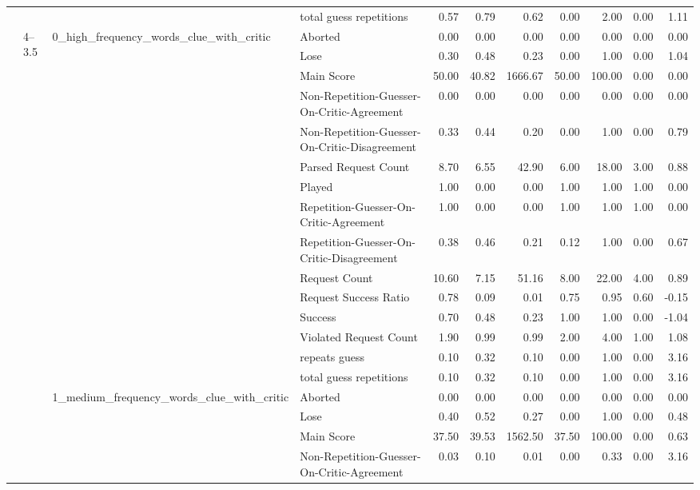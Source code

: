 \begin{tabular}{llllrrrrrrr}
 &  &  & total guess repetitions & 0.57 & 0.79 & 0.62 & 0.00 & 2.00 & 0.00 & 1.11 \\
\cline{2-11} \cline{3-11}
 & \multirow[t]{45}{*}{4--3.5} & \multirow[t]{15}{*}{0_high_frequency_words_clue_with_critic} & Aborted & 0.00 & 0.00 & 0.00 & 0.00 & 0.00 & 0.00 & 0.00 \\
 &  &  & Lose & 0.30 & 0.48 & 0.23 & 0.00 & 1.00 & 0.00 & 1.04 \\
 &  &  & Main Score & 50.00 & 40.82 & 1666.67 & 50.00 & 100.00 & 0.00 & 0.00 \\
 &  &  & Non-Repetition-Guesser-On-Critic-Agreement & 0.00 & 0.00 & 0.00 & 0.00 & 0.00 & 0.00 & 0.00 \\
 &  &  & Non-Repetition-Guesser-On-Critic-Disagreement & 0.33 & 0.44 & 0.20 & 0.00 & 1.00 & 0.00 & 0.79 \\
 &  &  & Parsed Request Count & 8.70 & 6.55 & 42.90 & 6.00 & 18.00 & 3.00 & 0.88 \\
 &  &  & Played & 1.00 & 0.00 & 0.00 & 1.00 & 1.00 & 1.00 & 0.00 \\
 &  &  & Repetition-Guesser-On-Critic-Agreement & 1.00 & 0.00 & 0.00 & 1.00 & 1.00 & 1.00 & 0.00 \\
 &  &  & Repetition-Guesser-On-Critic-Disagreement & 0.38 & 0.46 & 0.21 & 0.12 & 1.00 & 0.00 & 0.67 \\
 &  &  & Request Count & 10.60 & 7.15 & 51.16 & 8.00 & 22.00 & 4.00 & 0.89 \\
 &  &  & Request Success Ratio & 0.78 & 0.09 & 0.01 & 0.75 & 0.95 & 0.60 & -0.15 \\
 &  &  & Success & 0.70 & 0.48 & 0.23 & 1.00 & 1.00 & 0.00 & -1.04 \\
 &  &  & Violated Request Count & 1.90 & 0.99 & 0.99 & 2.00 & 4.00 & 1.00 & 1.08 \\
 &  &  & repeats guess & 0.10 & 0.32 & 0.10 & 0.00 & 1.00 & 0.00 & 3.16 \\
 &  &  & total guess repetitions & 0.10 & 0.32 & 0.10 & 0.00 & 1.00 & 0.00 & 3.16 \\
\cline{3-11}
 &  & \multirow[t]{15}{*}{1_medium_frequency_words_clue_with_critic} & Aborted & 0.00 & 0.00 & 0.00 & 0.00 & 0.00 & 0.00 & 0.00 \\
 &  &  & Lose & 0.40 & 0.52 & 0.27 & 0.00 & 1.00 & 0.00 & 0.48 \\
 &  &  & Main Score & 37.50 & 39.53 & 1562.50 & 37.50 & 100.00 & 0.00 & 0.63 \\
 &  &  & Non-Repetition-Guesser-On-Critic-Agreement & 0.03 & 0.10 & 0.01 & 0.00 & 0.33 & 0.00 & 3.16 \\

\end{tabular}
